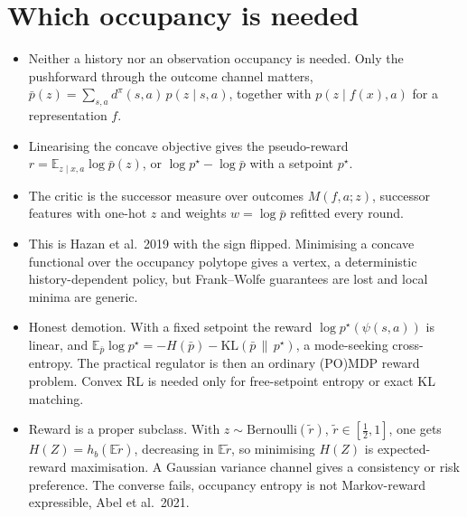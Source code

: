 \documentclass[10pt]{article}
\newcommand{\KL}{\mathrm{KL}}
\newcommand{\E}{\mathbb E}
\begin{document}
\section{Which occupancy is needed}
\begin{itemize}
  \item Neither a history nor an observation occupancy is needed.
    Only the pushforward through the outcome channel matters, $\bar p(z) = \sum_{s,a} d^\pi(s,a)\, p(z \mid s,a)$, together with $p(z \mid f(x),a)$ for a representation $f$.
  \item Linearising the concave objective gives the pseudo-reward $r = \E_{z \mid x,a} \log \bar p(z)$, or $\log p^\star - \log \bar p$ with a setpoint $p^\star$.
  \item The critic is the successor measure over outcomes $M(f,a;z)$, successor features with one-hot $z$ and weights $w = \log \bar p$ refitted every round.
  \item This is Hazan et al.\ 2019 with the sign flipped.
    Minimising a concave functional over the occupancy polytope gives a vertex, a deterministic history-dependent policy, but Frank--Wolfe guarantees are lost and local minima are generic.
  \item Honest demotion.
    With a fixed setpoint the reward $\log p^\star(\psi(s,a))$ is linear, and $\E_{\bar p} \log p^\star = -H(\bar p) - \KL(\bar p \,\|\, p^\star)$, a mode-seeking cross-entropy.
    The practical regulator is then an ordinary (PO)MDP reward problem.
    Convex RL is needed only for free-setpoint entropy or exact KL matching.
  \item Reward is a proper subclass.
    With $z \sim \mathrm{Bernoulli}(\tilde r)$, $\tilde r \in [\tfrac12,1]$, one gets $H(Z) = h_b(\E \tilde r)$, decreasing in $\E\tilde r$, so minimising $H(Z)$ is expected-reward maximisation.
    A Gaussian variance channel gives a consistency or risk preference.
    The converse fails, occupancy entropy is not Markov-reward expressible, Abel et al.\ 2021.
\end{itemize}
\end{document}
